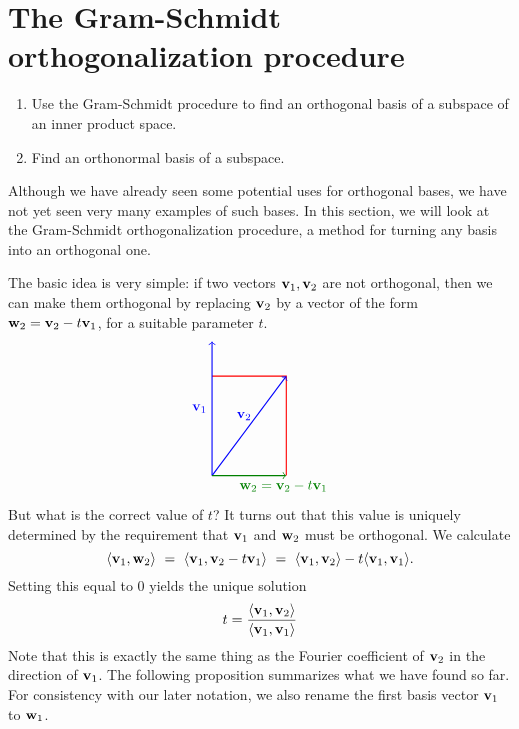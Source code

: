 \section{The Gram-Schmidt orthogonalization procedure}

\begin{outcome}
  \begin{enumerate}
  \item Use the Gram-Schmidt procedure to find an orthogonal basis
    of a subspace of an inner product space.
  \item Find an orthonormal basis of a subspace.
  \end{enumerate}
\end{outcome}

Although we have already seen some potential uses for orthogonal
bases, we have not yet seen very many examples of such bases. In this
section, we will look at the Gram-Schmidt orthogonalization procedure,
a method for turning any basis into an orthogonal one.

The basic idea is very simple: if two vectors $\vect{v}_1,\vect{v}_2$
are not orthogonal, then we can make them orthogonal by replacing
$\vect{v}_2$ by a vector of the form $\vect{w}_2 = \vect{v}_2 -
t\vect{v}_1$, for a suitable parameter $t$.
\begin{equation*}
  \begin{tikzpicture}[scale=1.25]
    \draw[thick,red] (1.5,0) -- (1.5,2) -- (0,2);
    \draw[thick,blue,->] (0,0) -- node[left]{$\vect{v}_1$} (0,2.7);
    \draw[thick,blue,->] (0,0) -- node[left, pos=0.6]{$\vect{v}_2$} (1.5,2);
    \draw[thick,green!50!black,->] (0,0) -- node[below right, pos=0.3]{$\vect{w}_2 = \vect{v}_2 - t\vect{v}_1$} (1.5,0);
  \end{tikzpicture}
\end{equation*}
But what is the correct value of $t$? It turns out that this value is
uniquely determined by the requirement that $\vect{v}_1$ and
$\vect{w}_2$ must be orthogonal. We calculate
\begin{equation*}
  \iprod{\vect{v}_1,\vect{w}_2}
  ~=~ \iprod{\vect{v}_1,\vect{v}_2-t\vect{v}_1}
  ~=~ \iprod{\vect{v}_1,\vect{v}_2}-t\iprod{\vect{v}_1,\vect{v}_1}.
\end{equation*}
Setting this equal to $0$ yields the unique solution
\begin{equation*}
  t = \frac{\iprod{\vect{v}_1,\vect{v}_2}}{\iprod{\vect{v}_1,\vect{v}_1}}
\end{equation*}
Note that this is exactly the same thing as the Fourier coefficient of
$\vect{v}_2$ in the direction of $\vect{v}_1$. The following
proposition summarizes what we have found so far. For consistency with
our later notation, we also rename the first basis vector $\vect{v}_1$
to $\vect{w}_1$.

